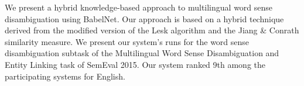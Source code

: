 We present a hybrid knowledge-based approach to multilingual word sense disambiguation using BabelNet. Our approach is based on a hybrid technique derived from the modified version of the Lesk algorithm and the Jiang \& Conrath similarity measure. We present our system's runs for the word sense disambiguation subtask of the Multilingual Word Sense Disambiguation and Entity Linking task of SemEval 2015. Our system ranked 9th among the participating systems for English.
